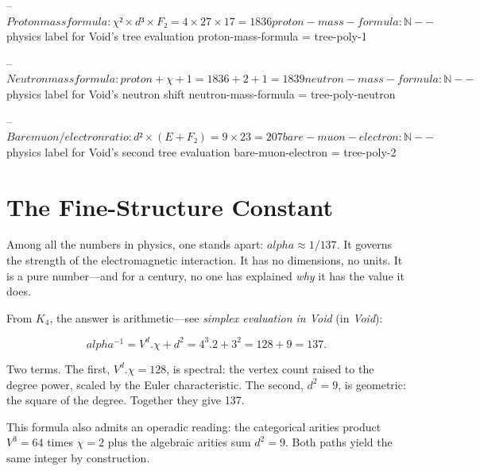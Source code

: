 \documentclass[11pt,a4paper]{book}
\def\alpha{alpha}%
\def\cdot{.}%
\newcommand{\VoidRef}[2]{\textit{#2} (in \textit{Void})}
\begin{document}
\begin{code}
-- $ Proton mass formula: χ² × d³ × F₂ = 4 × 27 × 17 = 1836
proton-mass-formula : ℕ
-- $ physics label for Void's tree evaluation
proton-mass-formula = tree-poly-1

-- $ Neutron mass formula: proton + χ + 1 = 1836 + 2 + 1 = 1839
neutron-mass-formula : ℕ
-- $ physics label for Void's neutron shift
neutron-mass-formula = tree-poly-neutron

-- $ Bare muon/electron ratio: d² × (E + F₂) = 9 × 23 = 207
bare-muon-electron : ℕ
-- $ physics label for Void's second tree evaluation
bare-muon-electron = tree-poly-2
\end{code}

\section{The Fine-Structure Constant}

Among all the numbers in physics, one stands apart: $\alpha \approx 1/137$. It governs the strength of the electromagnetic interaction. It has no dimensions, no units. It is a pure number---and for a century, no one has explained \emph{why} it has the value it does.

From $K_4$, the answer is arithmetic---see \VoidRef{sec:rational-measurement:simplex-eval-137}{simplex evaluation in Void}:

\[
\alpha^{-1} = V^d \cdot \chi + d^2 = 4^3 \cdot 2 + 3^2 = 128 + 9 = 137.
\]

Two terms. The first, $V^d \cdot \chi = 128$, is spectral: the vertex count raised to the degree power, scaled by the Euler characteristic. The second, $d^2 = 9$, is geometric: the square of the degree. Together they give 137.

This formula also admits an operadic reading: the categorical arities product $V^3 = 64$ times $\chi = 2$ plus the algebraic arities sum $d^2 = 9$. Both paths yield the same integer by construction.

\end{document}
